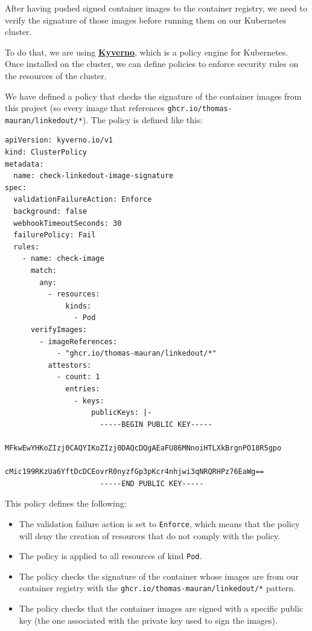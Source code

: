 \documentclass[12pt,x11names]{article}
\begin{document}
After having pushed signed container images to the container registry, we need to verify
the signature of those images before running them on our Kubernetes cluster.

\medskip
To do that, we are using \href{https://kyverno.io/}{\textbf{Kyverno}}, which is a
policy engine for Kubernetes. Once installed on the cluster, we can define policies to
enforce security rules on the resources of the cluster.

\medskip
We have defined a policy that checks the signature of the container images from this
project (so every image that references \texttt{ghcr.io/thomas-mauran/linkedout/*}). The
policy is defined like this:

\begin{lstlisting}
apiVersion: kyverno.io/v1
kind: ClusterPolicy
metadata:
  name: check-linkedout-image-signature
spec:
  validationFailureAction: Enforce
  background: false
  webhookTimeoutSeconds: 30
  failurePolicy: Fail
  rules:
    - name: check-image
      match:
        any:
          - resources: 
              kinds:
                - Pod
      verifyImages:
        - imageReferences:
            - "ghcr.io/thomas-mauran/linkedout/*"
          attestors:
            - count: 1
              entries:
                - keys:
                    publicKeys: |-
                      -----BEGIN PUBLIC KEY-----
                      MFkwEwYHKoZIzj0CAQYIKoZIzj0DAQcDQgAEaFU86MNnoiHTLXkBrgnPO18R5gpo
                      cMic199RKzUa6YftDcDCEovrR0nyzfGp3pKcr4nhjwi3qNRQRHPz76EaWg==
                      -----END PUBLIC KEY-----
\end{lstlisting}

This policy defines the following:

\begin{itemize}
  \item The validation failure action is set to \texttt{Enforce}, which means that the
  policy will deny the creation of resources that do not comply with the policy.
  \item The policy is applied to all resources of kind \texttt{Pod}.
  \item The policy checks the signature of the container whose images are from our
  container registry with the \texttt{ghcr.io/thomas-mauran/linkedout/*} pattern.
  \item The policy checks that the container images are signed with a specific public
  key (the one associated with the private key used to sign the images).
\end{itemize}
\end{document}
